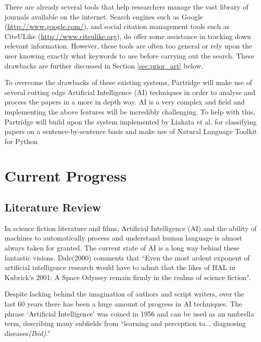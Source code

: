 \documentclass[12pt,a4paper]{article}
\begin{document}
There are already several tools that help researchers manage the vast library
of journals available on the internet. Search engines such as Google
({\url{http://www.google.com/}}), and social citation management tools such as
CiteULike ({\url{http://www.citeulike.org}}), do offer some assistance in
tracking down relevant information. However, these tools are often too general
or rely upon the user knowing exactly what keywords to use before carrying out
the search. These drawbacks are further discussed in Section
\ref{sec:prior_art} below.

To overcome the drawbacks of these existing systems, Partridge will make use of
several cutting edge Artificial Intelligence (AI) techniques in order to analyse and
process the papers in a more in depth way. AI is a very complex and field and
implementing the above features will be incredibly challenging. To help with
this, Partridge will build upon the system implemented by Liakata et al. for
classifying papers on a sentence-by-sentence basis\cite{citeulike:10444769} and
make use of Natural Language Toolkit for Python
\cite{bird2009natural} 

\section{Current Progress}

\subsection{Literature Review}

In science fiction literature and films, Artificial Intelligence (AI) and the
ability of machines to automatically process and understand human language is
almost always taken for granted. The current state of AI is a long way behind these
fantastic visions. Dale(2000) comments that ``Even the most ardent exponent of
artificial intelligence research would have to admit that the likes of HAL in
Kubrick's 2001: A Space Odyssey remain firmly in the realms of science
fiction\cite{dale2000handbook}".

Despite lacking behind the imagination of authors and script writers, over the last 60 years there
has been a huge amount of progress in AI techniques. The phrase `Artificial
Intelligence' was coined in 1956\cite{russell2010artificial} and can be used as
an umbrella term, describing many subfields from ``learning and perception
to... diagnosing diseases\emph{(Ibid)}."
\end{document}
